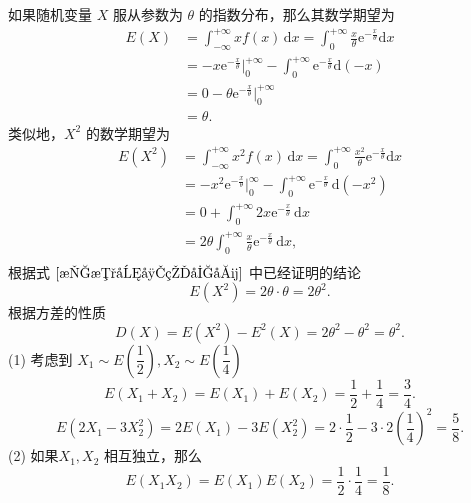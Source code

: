 \begin{solution}
    如果随机变量 $X$ 服从参数为 $\theta$ 的指数分布，那么其数学期望为
    \begin{equation}\label{指数分布的均值}
        \begin{aligned}
            E(X)
             & = \int_{-\infty}^{+\infty} xf(x) \,\mathrm{d}x = \int_{0}^{+\infty} \frac{x}{\theta}\mathrm{e}^{-\frac{x}{\theta}} \mathrm{d}x \\
             & = -x\mathrm{e}^{-\frac{x}{\theta}}\Big|_{0}^{+\infty} - \int_{0}^{+\infty} \mathrm{e}^{-\frac{x}{\theta}} \mathrm{d}(-x)       \\
             & = 0 - \theta\mathrm{e}^{-\frac{x}{\theta}}\Big|_{0}^{+\infty}                                                                  \\
             & = \theta.
        \end{aligned}
    \end{equation}
    类似地，$X^2$ 的数学期望为
    \begin{equation}
        \begin{aligned}
            E(X^2)
             & = \int_{-\infty}^{+\infty} x^2f(x) \,\mathrm{d}x
            = \int_{0}^{+\infty} \frac{x^2}{\theta}\mathrm{e}^{-\frac{x}{\theta}} \mathrm{d}x                                                \\
             & = -x^2\mathrm{e}^{-\frac{x}{\theta}}\Big|_{0}^{\infty} - \int_{0}^{+\infty} \mathrm{e}^{-\frac{x}{\theta}} \,\mathrm{d}(-x^2) \\
             & = 0 + \int_{0}^{+\infty} 2x\mathrm{e}^{-\frac{x}{\theta}} \,\mathrm{d}x                                                       \\
             & = 2\theta\int_{0}^{+\infty} \frac{x}{\theta}\mathrm{e}^{-\frac{x}{\theta}} \,\mathrm{d}x,                                     \\
        \end{aligned}
    \end{equation}
    根据式 $\eqref{指数分布的均值}$ 中已经证明的结论
    \begin{equation}
        E(X^2) = 2\theta \cdot \theta = 2\theta^2.
    \end{equation}
    根据方差的性质
    \begin{equation}\label{指数分布的方差}
        D(X) = E(X^2) - E^2(X) = 2\theta^2 - \theta^2 = \theta^2.
    \end{equation}
    (1) 考虑到 $X_1 \sim E\left(\dfrac{1}{2}\right), X_2 \sim E\left(\dfrac{1}{4}\right)$
    $$
        E(X_1+X_2) = E(X_1) + E(X_2) = \frac{1}{2} + \frac{1}{4} = \frac{3}{4}.
    $$
    $$
        E\left(2X_1 - 3X_2^2\right)
        = 2E(X_1) - 3E(X_2^2)
        = 2\cdot\frac{1}{2} - 3 \cdot 2\left(\frac{1}{4}\right)^2
        = \frac{5}{8}.
    $$
    (2) 如果$X_1,X_2$ 相互独立，那么
    $$
        E(X_1X_2) = E(X_1)E(X_2) = \frac{1}{2} \cdot \frac{1}{4} = \frac{1}{8}.
    $$
\end{solution}


